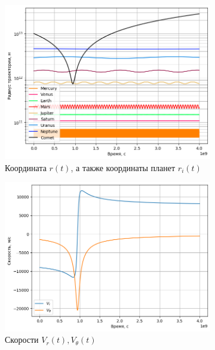 \begin{figure}[H]
    \centering
    \begin{subfigure}{0.49\linewidth}
        \centering
		\includegraphics[width=1\linewidth]{imgs_8/rRunBy.png}
		\caption{Координата $r(t)$, а также координаты планет $r_i(t)$}
	\end{subfigure}
	\begin{subfigure}{0.49\linewidth}
        \centering
		\includegraphics[width=1\linewidth]{imgs_8/vRunBy.png}
		\caption{Скорости $V_r(t), V_\theta(t)$}
	\end{subfigure}
	\begin{subfigure}{0.49\linewidth}
        \centering

\end{subfigure}
\end{figure}
